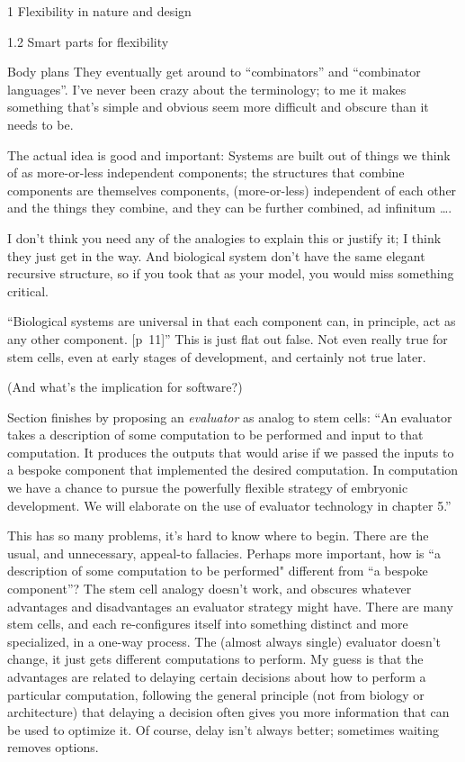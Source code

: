 \documentclass[12pt]{PalisadesLakesBook}
\begin{document}
\begin{plSection}{}
\begin{plSection}{1 Flexibility in nature and design}
\begin{plSection}{1.2 Smart parts for flexibility}
\begin{plSection}{Body plans}
They eventually get around to ``combinators''
and ``combinator languages''.
I've never been crazy about the terminology;
to me it makes something that's simple and obvious 
seem more difficult
and obscure than it needs to be.

The actual idea is good and important:
Systems are built out of things we think of as more-or-less
independent components;
the structures that combine components 
are themselves components,
(more-or-less) independent of each other 
and the things they combine,
and they can be further combined, ad infinitum {\ldots}.

I don't think you need any of the analogies to explain this
or justify it; I think they just get in the way.
And biological system don't have the same elegant recursive
structure, so if you took that as your model, 
you would miss something critical.

``Biological systems are universal in that each component can,
in principle, act as any other component. [p~11]''
This is just flat out false. 
Not even really true for stem cells, 
even at early stages of development,
and certainly not true later.

(And what's the implication for software?)

Section finishes by proposing an \emph{evaluator} as 
analog to stem cells:
``An evaluator takes a description of some computation
to be performed and input to that computation.
It produces the outputs that would arise if we passed the inputs
to a bespoke component that implemented the desired computation.
In computation we have a chance to pursue the powerfully
flexible strategy of embryonic development.
We will elaborate on the use of evaluator technology in chapter 5.''

This has so many problems, it's hard to know where to begin.
There are the usual, and unnecessary, appeal-to fallacies.
Perhaps more important, how is 
``a description of some computation to be performed"
different from 
``a bespoke component''? 
The stem cell analogy doesn't work, and obscures whatever
advantages and disadvantages an evaluator strategy might have.
There are many stem cells,
and each re-configures itself
into something distinct and more specialized, 
in a one-way process.
The (almost always single) evaluator doesn't change, 
it just gets different computations to perform.
My guess is that the advantages are related to delaying
certain decisions about how to perform a particular computation,
following the general principle (not from biology or architecture)
that delaying a decision often gives you 
more information that can be used to optimize it.
Of course, delay isn't always better; 
sometimes waiting removes options.


\end{plSection}
\end{plSection}
\end{plSection}
\end{plSection}
\end{document}
